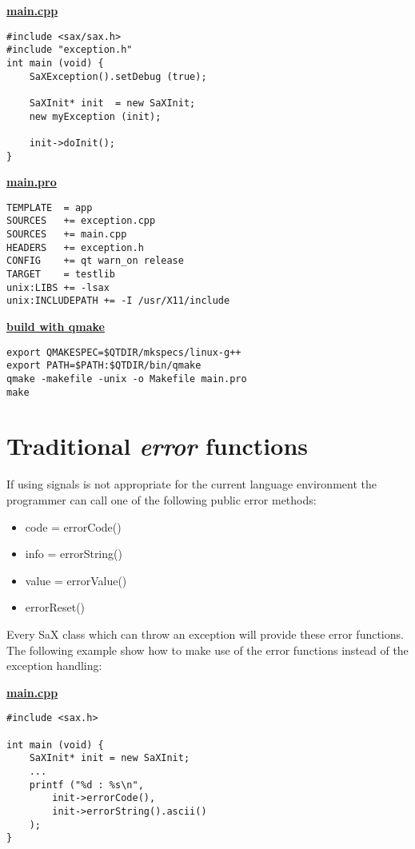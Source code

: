 \textbf{\underline{main.cpp}}

\begin{Command}{12cm}
\begin{small}
\begin{verbatim}
#include <sax/sax.h>
#include "exception.h"
int main (void) {
    SaXException().setDebug (true);

    SaXInit* init  = new SaXInit;
    new myException (init);

    init->doInit();
}
\end{verbatim}
\end{small}
\end{Command}

\textbf{\underline{main.pro}}

\begin{Command}{12cm}
\begin{small}
\begin{verbatim}
TEMPLATE  = app
SOURCES   += exception.cpp
SOURCES   += main.cpp
HEADERS   += exception.h
CONFIG    += qt warn_on release
TARGET    = testlib
unix:LIBS += -lsax
unix:INCLUDEPATH += -I /usr/X11/include
\end{verbatim}
\end{small}
\end{Command}

\textbf{\underline{build with qmake}}

\begin{Command}{12cm}
\begin{small}
\begin{verbatim}
export QMAKESPEC=$QTDIR/mkspecs/linux-g++
export PATH=$PATH:$QTDIR/bin/qmake
qmake -makefile -unix -o Makefile main.pro
make
\end{verbatim}
\end{small}
\end{Command}

\newpage

\section{Traditional \textit{error} functions}
If using signals is not appropriate for the current language environment
the programmer can call one of the following public error methods:
\begin{itemize}
\item code = errorCode()
\item info = errorString()
\item value = errorValue()
\item errorReset()
\end{itemize}
Every SaX class which can throw an exception will provide these
error functions. The following example show how to make use of the error
functions instead of the exception handling:

\textbf{\underline{main.cpp}}

\begin{Command}{12cm}
\begin{small}
\begin{verbatim}
#include <sax.h>

int main (void) {
    SaXInit* init = new SaXInit;
    ...
    printf ("%d : %s\n",
        init->errorCode(),
        init->errorString().ascii()
    );
}
\end{verbatim}
\end{small}
\end{Command}
